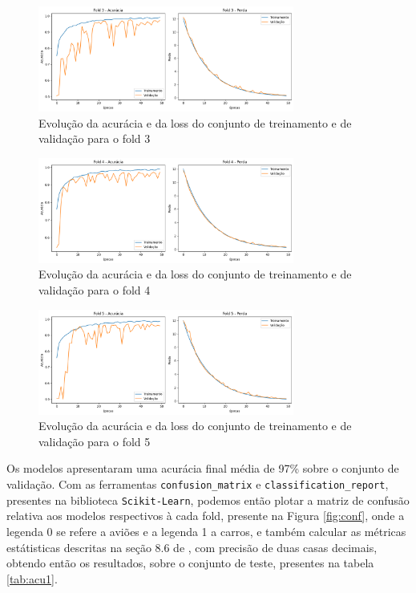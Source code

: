 \documentclass[]{abntex2}
\begin{document}
\begin{figure}[H]
    \centering 
    \includegraphics[width=0.75\textwidth]{imgs/ex2/train_f3.png}
    \caption{Evolução da acurácia e da loss do conjunto de treinamento e de validação para o fold 3}
    \label{fig:t3} %
\end{figure}

\begin{figure}[H]
    \centering 
    \includegraphics[width=0.75\textwidth]{imgs/ex2/train_f4.png}
    \caption{Evolução da acurácia e da loss do conjunto de treinamento e de validação para o fold 4}
    \label{fig:t4} %
\end{figure}

\begin{figure}[H]
    \centering 
    \includegraphics[width=0.75\textwidth]{imgs/ex2/train_f5.png}
    \caption{Evolução da acurácia e da loss do conjunto de treinamento e de validação para o fold 5}
    \label{fig:t5} %
\end{figure}

Os modelos apresentaram uma acurácia final média de 97\% sobre o conjunto de validação. Com as ferramentas \texttt{confusion\_matrix} e \texttt{classification\_report}, presentes na biblioteca \texttt{Scikit-Learn}, podemos então plotar a matriz de confusão relativa aos modelos respectivos à cada fold, presente na Figura \ref{fig:conf}, onde a legenda 0 se refere a aviões e a legenda 1 a carros, e também calcular as métricas estátisticas descritas na seção 8.6 de \cite{book}, com precisão de duas casas decimais, obtendo então os resultados, sobre o conjunto de teste, presentes na tabela \ref{tab:acu1}.
\end{document}
